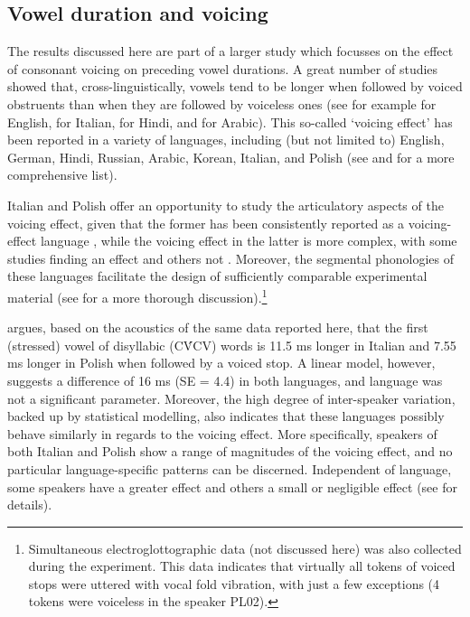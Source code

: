 \documentclass[preprint]{JASAnew}
\begin{document}
\hypertarget{vowel-duration-and-voicing}{%
\subsection{Vowel duration and
voicing}\label{vowel-duration-and-voicing}}

The results discussed here are part of a larger study which focusses on
the effect of consonant voicing on preceding vowel durations. A great
number of studies showed that, cross-linguistically, vowels tend to be
longer when followed by voiced obstruents than when they are followed by
voiceless ones (see for example
\citealt{house1953, peterson1960, chen1970, klatt1973, lisker1974, fowler1992}
for English, \citealt{farnetani1986, esposito2002} for Italian,
\citealt{lampp2004, durvasula2012} for Hindi, and \citealt{hussein1994}
for Arabic). This so-called `voicing effect' has been reported in a
variety of languages, including (but not limited to) English, German,
Hindi, Russian, Arabic, Korean, Italian, and Polish (see
\citealt{maddieson1976} and \citealt{begus2017} for a more comprehensive
list).

Italian and Polish offer an opportunity to study the articulatory
aspects of the voicing effect, given that the former has been
consistently reported as a voicing-effect language
\citep{caldognetto1979, farnetani1986, esposito2002}, while the voicing
effect in the latter is more complex, with some studies finding an
effect \citep{slowiaczek1985, nowak2006, malisz2008, coretta2019k} and
others not \citep{keating1984, jassem1989}. Moreover, the segmental
phonologies of these languages facilitate the design of sufficiently
comparable experimental material (see \citealt{coretta2019k} for a more
thorough
discussion).\footnote{Simultaneous electroglottographic data (not discussed here) was also collected during the experiment. This data indicates that virtually all tokens of voiced stops were uttered with vocal fold vibration, with just a few exceptions (4 tokens were voiceless in the speaker PL02).}

\citet{coretta2019k} argues, based on the acoustics of the same data
reported here, that the first (stressed) vowel of disyllabic (CV́CV)
words is 11.5 ms longer in Italian and 7.55 ms longer in Polish when
followed by a voiced stop. A linear model, however, suggests a
difference of 16 ms (SE = 4.4) in both languages, and language was not a
significant parameter. Moreover, the high degree of inter-speaker
variation, backed up by statistical modelling, also indicates that these
languages possibly behave similarly in regards to the voicing effect.
More specifically, speakers of both Italian and Polish show a range of
magnitudes of the voicing effect, and no particular language-specific
patterns can be discerned. Independent of language, some speakers have a
greater effect and others a small or negligible effect (see
\citealt{coretta2019k} for details).
\end{document}
